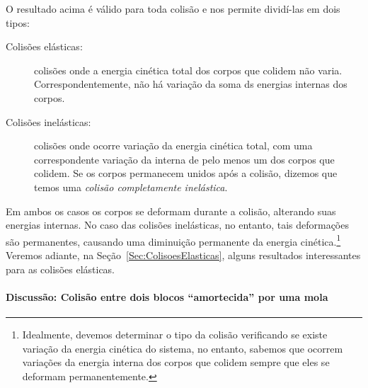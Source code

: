 O resultado acima é válido para toda colisão e nos permite dividí-las em dois tipos:
\begin{description}
    \item[Colisões elásticas:] colisões onde a energia cinética total dos corpos que colidem não varia. Correspondentemente, não há variação da soma ds energias internas dos corpos.
    
    \item[Colisões inelásticas:] colisões onde ocorre variação da energia cinética total, com uma correspondente variação da interna de pelo menos um dos corpos que colidem. Se os corpos permanecem unidos após a colisão, dizemos que temos uma \emph{colisão completamente inelástica}.
\end{description}
%
Em ambos os casos os corpos se deformam durante a colisão, alterando suas energias internas. No caso das colisões inelásticas, no entanto, tais deformações são permanentes, causando uma diminuição permanente da energia cinética.\footnote[][-10cm]{Idealmente, devemos determinar o tipo da colisão verificando se existe variação da energia cinética do sistema, no entanto, sabemos que ocorrem variações da energia interna dos corpos que colidem sempre que eles se deformam permanentemente.} Veremos adiante, na Seção~\ref{Sec:ColisoesElasticas}, alguns resultados interessantes para as colisões elásticas.



\paragraph{Discussão: Colisão entre dois blocos ``amortecida'' por uma mola}

